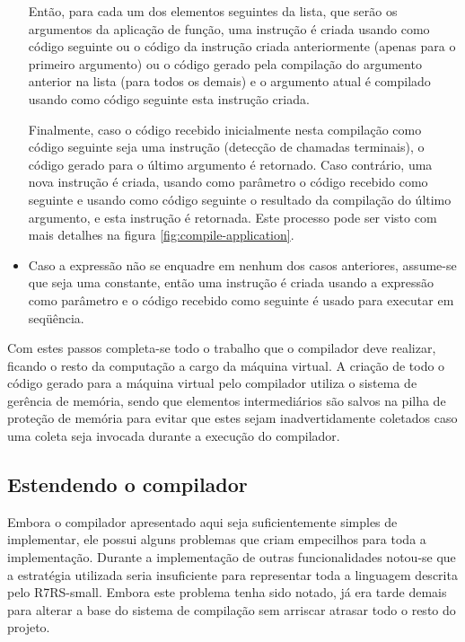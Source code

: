 \begin{itemize}
Então, para cada um dos elementos seguintes da lista, que serão os argumentos
da aplicação de função, uma instrução   é criada usando como
código seguinte ou o código da instrução  criada anteriormente 
(apenas para o primeiro argumento) ou o código gerado pela compilação do
argumento anterior na lista (para todos os demais) e o argumento atual é
compilado usando como código seguinte esta instrução  criada.

Finalmente, caso o código recebido inicialmente nesta compilação como código
seguinte seja uma instrução  (detecção de chamadas terminais),
o código gerado para o último argumento é retornado. Caso contrário, uma nova
instrução  é criada, usando como parâmetro o código recebido como
seguinte e usando como código seguinte o resultado da compilação do último 
argumento, e esta instrução  é retornada. Este processo pode ser
visto com mais detalhes na figura \ref{fig:compile-application}.

\item Caso a expressão não se enquadre em nenhum dos casos anteriores, 
assume-se que seja uma constante, então uma instrução  é criada
usando a expressão como parâmetro e o código recebido como seguinte é usado 
para executar em seqüência.

\end{itemize}

Com estes passos completa-se todo o trabalho que o compilador deve realizar,
ficando o resto da computação a cargo da máquina virtual. A criação de todo o
código gerado para a máquina virtual pelo compilador utiliza o sistema de 
gerência de memória, sendo que elementos intermediários são salvos na pilha de 
proteção de memória para evitar que estes sejam inadvertidamente coletados caso
uma coleta seja invocada durante a execução do compilador. 

\subsection{Estendendo o compilador}
\label{ss:solucoes-compilador}

Embora o compilador apresentado aqui seja suficientemente simples de implementar,
ele possui alguns problemas que criam empecilhos para toda a implementação.
Durante a implementação de outras funcionalidades notou-se que a estratégia
utilizada seria insuficiente para representar toda a linguagem descrita pelo
\acs{R7RS}-small.  Embora este problema tenha sido notado, já era tarde demais
para alterar a base do sistema de compilação sem arriscar atrasar todo o resto
do projeto.

